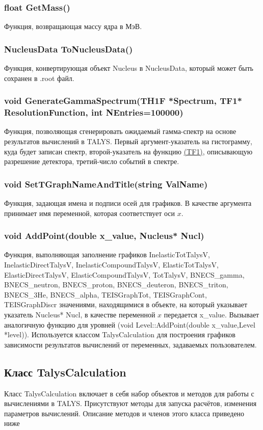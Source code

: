 \documentclass[a4paper,12pt]{extarticle}
\begin{document}
\subsubsection{float GetMass()}
Функция, возвращающая массу ядра в МэВ.
\subsubsection{NucleusData ToNucleusData()}
Функция, конвертирующая объект Nucleus в NucleusData, который может быть сохранен в .root файл.
\subsubsection{void GenerateGammaSpectrum(TH1F *Spectrum, TF1* ResolutionFunction, int NEntries=100000)}
Функция, позволяющая сгенерировать ожидаемый гамма-спектр на основе результатов вычислений в TALYS. Первый аргумент-указатель на гистограмму, куда будет записан спектр, второй-указатель на функцию \href{https://root.cern.ch/doc/master/classTF1.html}{(TF1)}, описывающую разрешение детектора, третий-число событий в спектре.
\subsubsection{void SetTGraphNameAndTitle(string ValName)}
Функция, задающая имена и подписи осей для графиков. В качестве аргумента принимает имя переменной, которая соответствует оси $x$.
\subsubsection{void AddPoint(double x_value, Nucleus* Nucl)}
Функция, выполняющая заполнение графиков InelasticTotTalysV, InelasticDirectTalysV, InelasticCompoundTalysV, ElasticTotTalysV, ElasticDirectTalysV, ElasticCompoundTalysV, TotTalysV, BNECS_gamma, BNECS_neutron, BNECS_proton, BNECS_deuteron, BNECS_triton, BNECS_3He, BNECS_alpha, TEISGraphTot, TEISGraphCont, TEISGraphDiscr значениями, находящимися в объекте, на который указывает указатель Nucleus* Nucl, в качестве переменной $x$ передается x_value. Вызывает аналогичную функцию для уровней (void Level::AddPoint(double x_value,Level *level)). Используется классом TalysCalculation для построения графиков зависимости результатов вычислений от переменных, задаваемых пользователем.

\subsection{Класс TalysCalculation}
Класс TalysCalculation включает в себя набор объектов и методов для работы с вычислениями в TALYS. Присутствуют методы для запуска расчётов, изменения параметров вычислений. Описание методов и членов этого класса приведено ниже
\end{document}
